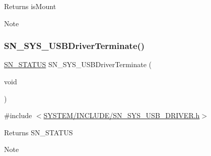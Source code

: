 \begin{DoxyReturn}{Returns}
is\+Mount 
\end{DoxyReturn}
\begin{DoxyNote}{Note}

\end{DoxyNote}
\mbox{\label{group__SYSTEM__USB__DRIVER_ga60bc7a83a5370d89dffe6e3d4ad88538}} 
\subsubsection{\texorpdfstring{S\+N\+\_\+\+S\+Y\+S\+\_\+\+U\+S\+B\+Driver\+Terminate()}{SN\_SYS\_USBDriverTerminate()}}
{\footnotesize\ttfamily \hyperlink{group__SYSTEM__ERROR_ga4540713b9a7a18ce44d78c3a10f7442f}{S\+N\+\_\+\+S\+T\+A\+T\+US} S\+N\+\_\+\+S\+Y\+S\+\_\+\+U\+S\+B\+Driver\+Terminate (\begin{DoxyParamCaption}\item[{void}]{ }\end{DoxyParamCaption})}



{\ttfamily \#include $<$\hyperlink{SN__SYS__USB__DRIVER_8h}{S\+Y\+S\+T\+E\+M/\+I\+N\+C\+L\+U\+D\+E/\+S\+N\+\_\+\+S\+Y\+S\+\_\+\+U\+S\+B\+\_\+\+D\+R\+I\+V\+E\+R.\+h}$>$}

\begin{DoxyReturn}{Returns}
S\+N\+\_\+\+S\+T\+A\+T\+US 
\end{DoxyReturn}
\begin{DoxyNote}{Note}

\end{DoxyNote}
